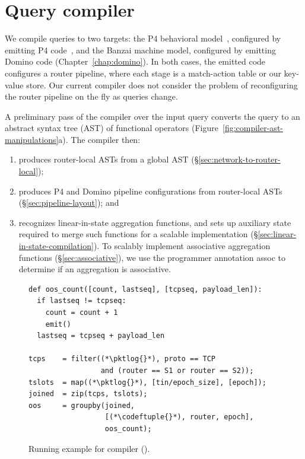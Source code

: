 \section{Query compiler}
\label{sec:compiler}

We compile \TheSystem queries to two targets: the P4 behavioral
model~\cite{p4-bmv2}, configured by emitting P4 code~\cite{p4_16}, and the
Banzai machine model, configured by emitting Domino code
(Chapter~\ref{chap:domino}).  In both cases, the emitted code configures a
router pipeline, where each stage is a match-action table or our key-value
store. Our current compiler does not consider the problem of reconfiguring the
router pipeline on the fly as queries change.

A preliminary pass of the compiler over the input query converts the query to
an abstract syntax tree (AST) of functional operators
(Figure~\ref{fig:compiler-ast-manipulations}a). The compiler then:
\begin{enumerate}
\item produces router-local ASTs from a global AST
  (\S\ref{sec:network-to-router-local});
\item produces P4 and Domino pipeline configurations from router-local ASTs
  (\S\ref{sec:pipeline-layout}); and
\item recognizes linear-in-state aggregation functions, and sets up
  auxiliary state required to merge such functions for a scalable implementation
  (\S\ref{sec:linear-in-state-compilation}). To scalably implement associative
  aggregation functions (\S\ref{sec:associative}), we use the programmer
  annotation {\ct assoc} to determine if an aggregation is associative.
\end{enumerate}

\begin{figure}[!t]{
\figcodesize
\begin{lstlisting}
def oos_count([count, lastseq], [tcpseq, payload_len]):
  if lastseq != tcpseq:
    count = count + 1
    emit()
  lastseq = tcpseq + payload_len

tcps    = filter((*\pktlog{}*), proto == TCP
                 and (router == S1 or router == S2));
tslots  = map((*\pktlog{}*), [tin/epoch_size], [epoch]);
joined  = zip(tcps, tslots);
oos     = groupby(joined,
                  [(*\codeftuple{}*), router, epoch],
                  oos_count);
\end{lstlisting}
}
\caption{Running example for \TheSystem compiler ().}
\label{fig:running-example-code}
\end{figure}

